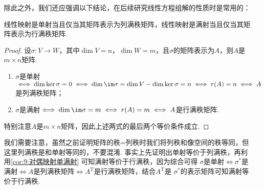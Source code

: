 除此之外，我们还应强调以下结论，在后续研究线性方程组解的性质时是常用的：
\begin{theorem}\label{thm:11:单满射与行列秩}
    线性映射是单射当且仅当其矩阵表示为列满秩矩阵，线性映射是满射当且仅当其矩阵表示为行满秩矩阵.
\end{theorem}
\begin{proof}
    设$\sigma:V\to W$，其中$\dim V=n$，$\dim W=m$，且$\sigma$的矩阵表示为$A$，则$A$是$m\times n$矩阵.
    \begin{enumerate}
        \item $\sigma$是单射$\iff\dim\ker\sigma=0\iff \dim\im\sigma=\dim V-\dim\ker\sigma=n\iff r(A)=n\iff A$是列满秩矩阵；
        \item $\sigma$是满射$\iff\dim\im\sigma=m\iff r(A)=m\iff A$是行满秩矩阵.
    \end{enumerate}
    特别注意$A$是$m\times n$矩阵，因此上述两式的最后两个等价条件成立.
\end{proof}

我们需要注意，虽然之前证明矩阵的秩=列秩时我们将列秩和像空间的秩等同，但这里列满秩是和单射等同的，不要混淆.
事实上先证明出单射等价于列满秩，再利用\autoref{cor:9:对偶映射单满射} 可知满射等价于行满秩，因为综合可得
$\sigma$是单射$\iff\sigma^*$是满射$\iff A$是列满秩矩阵$\iff A^\mathrm{T}$是行满秩矩阵，结合$A^\mathrm{T}$是
$\sigma^*$的表示矩阵可知满射等价于行满秩.

